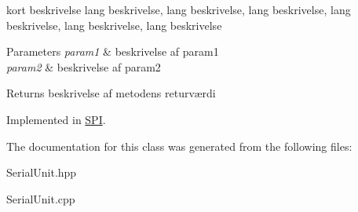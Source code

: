 kort beskrivelse lang beskrivelse, lang beskrivelse, lang beskrivelse, lang beskrivelse, lang beskrivelse, lang beskrivelse 


\begin{DoxyParams}{Parameters}
{\em param1} & beskrivelse af param1 \\
\hline
{\em param2} & beskrivelse af param2 \\
\hline
\end{DoxyParams}
\begin{DoxyReturn}{Returns}
beskrivelse af metodens returværdi 
\end{DoxyReturn}


Implemented in \hyperlink{classSPI_ad581e7b40a17f41f8d6db8dec97c9c4b}{S\+PI}.



The documentation for this class was generated from the following files\+:\begin{DoxyCompactItemize}
\item 
Serial\+Unit.\+hpp\item 
Serial\+Unit.\+cpp\end{DoxyCompactItemize}
